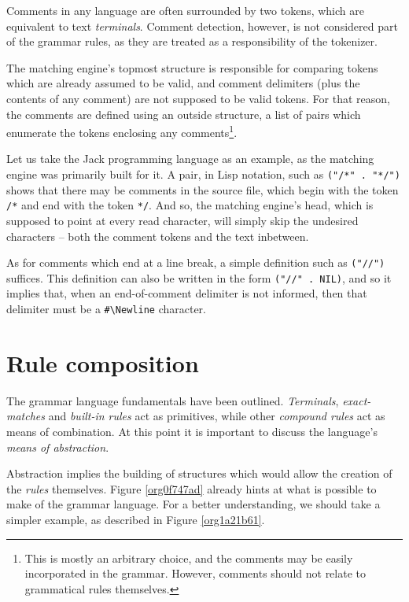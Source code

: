 \documentclass[a4paper,11pt,oneside]{article}
\begin{document}
Comments in any language are often surrounded by two tokens, which are
equivalent to text \emph{terminals}. Comment detection, however, is not
considered part of the grammar rules, as they are treated as a
responsibility of the tokenizer.

The matching engine's topmost structure is responsible for comparing
tokens which are already assumed to be valid, and comment delimiters
(plus the contents of any comment) are not supposed to be valid
tokens. For that reason, the comments are defined using an outside
structure, a list of pairs which enumerate the tokens enclosing any
comments\footnote{This is mostly an arbitrary choice, and the comments may be
easily incorporated in the grammar. However, comments should not
relate to grammatical rules themselves.}.

Let us take the Jack programming language as an example, as the
matching engine was primarily built for it. A pair, in Lisp notation,
such as \texttt{("/*" . "*/")} shows that there may be comments in the source
file, which begin with the token \texttt{/*} and end with the token \texttt{*/}. And
so, the matching engine's head, which is supposed to point at every
read character, will simply skip the undesired characters -- both the
comment tokens and the text inbetween.

As for comments which end at a line break, a simple definition such as
\texttt{("//")} suffices. This definition can also be written in the form
\texttt{("//" . NIL)}, and so it implies that, when an end-of-comment delimiter
is not informed, then that delimiter must be a \texttt{\#\textbackslash{}Newline} character.

\section{Rule composition}
\label{sec:org542dbc2}

The grammar language fundamentals have been outlined. \emph{Terminals},
\emph{exact-matches} and \emph{built-in rules} act as primitives, while other
\emph{compound rules} act as means of combination. At this point it is
important to discuss the language's \emph{means of abstraction}.

Abstraction implies the building of structures which would allow the
creation of the \emph{rules} themselves. Figure \ref{org0f747ad} already hints
at what is possible to make of the grammar language. For a better
understanding, we should take a simpler example, as described in
Figure \ref{org1a21b61}.
\end{document}
